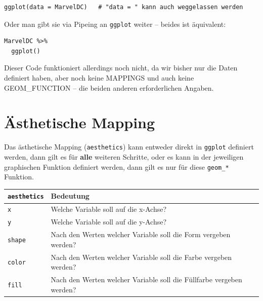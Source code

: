 \documentclass[
  ngerman,
]{book}
\begin{document}
\begin{verbatim}
ggplot(data = MarvelDC)   # "data = " kann auch weggelassen werden
\end{verbatim}

Oder man gibt sie via Pipeing an \texttt{ggplot} weiter -- beides ist äquivalent:

\begin{verbatim}
MarvelDC %>%
  ggplot()
\end{verbatim}

Dieser Code funktioniert allerdings noch nicht, da wir bisher nur die {Daten} definiert haben, aber noch keine {MAPPINGS} und auch keine {GEOM\_FUNCTION} -- die beiden anderen erforderlichen Angaben.

\section{Ästhetische Mapping}\label{uxe4sthetische-mapping}

Das {ästhetische Mapping} (\texttt{aesthetics}) kann entweder direkt in \texttt{ggplot} definiert werden, dann gilt es für \textbf{alle} weiteren Schritte, oder es kann in der jeweiligen {graphischen Funktion} definiert werden, dann gilt es nur für diese \texttt{geom\_*} Funktion.

\begin{longtable}[]{@{}
  >{\raggedright\arraybackslash}p{}
  >{\raggedright\arraybackslash}p{}@{}}
\toprule\noalign{}
\begin{minipage}[b]{\linewidth}\raggedright
\texttt{aesthetics}
\end{minipage} & \begin{minipage}[b]{\linewidth}\raggedright
Bedeutung
\end{minipage} \\
\midrule\noalign{}
\endhead
\bottomrule\noalign{}
\endlastfoot
\texttt{x} & Welche Variable soll auf die x-Achse? \\
\texttt{y} & Welche Variable soll auf die y-Achse? \\
\texttt{shape} & Nach den Werten welcher Variable soll die Form vergeben werden? \\
\texttt{color} & Nach den Werten welcher Variable soll die Farbe vergeben werden? \\
\texttt{fill} & Nach den Werten welcher Variable soll die Füllfarbe vergeben werden? \\
\end{longtable}
\end{document}
